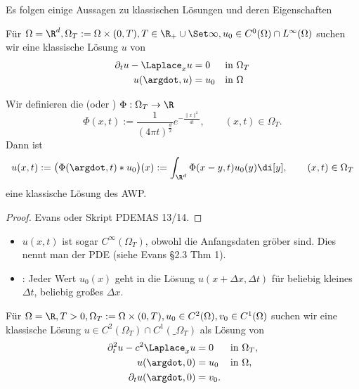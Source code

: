Es folgen einige Aussagen zu klassischen Lösungen und deren Eigenschaften

\begin{df} \label{1.19}
	Für $\Omega = \R^d, \Omega_T := \Omega \times (0, T), T \in \R_+ \cup \Set \infty, u_0 \in C^0(\Omega) \cap L^\infty(\Omega)$ suchen wir eine klassische Lösung $u$ von
	\begin{align*}
		\partial_t u - \Laplace_x u &= 0  &&\text{in $\Omega_T$}\\
		u(\argdot, u) &= u_0  &&\text{in $\Omega$}
	\end{align*}
\end{df}

\begin{st} \label{1.20}
	Wir definieren die  (oder ) $\Phi: \Omega_T \to \R$
	\[
		\Phi(x,t) := \frac{1}{(4\pi t)^{\frac{d}{2}}} e^{- \frac{\|x\|^2}{4t}},
		\qquad (x,t) \in \Omega_T.
	\]
	Dann ist
	\[
		u(x,t) := \big(\Phi(\argdot, t) \ast u_0\big) (x) := \int_{\R^d} \Phi(x-y, t) u_0(y) \di[y],
		\qquad (x,t) \in \Omega_T
	\]
	eine klassische Lösung des AWP.
	\begin{proof}
		Evans oder Skript PDEMAS 13/14.
	\end{proof}
	\begin{note}
		\begin{itemize}
			\item
				$u(x,t)$ ist sogar $C^\infty(\Omega_T)$, obwohl die Anfangsdaten gröber sind.
				Dies nennt man  der PDE (siehe Evans §2.3 Thm 1).
			\item
				: Jeder Wert $u_0(x)$ geht in die Lösung $u(x + \Delta x, \Delta t)$ für beliebig kleines $\Delta t$, beliebig großes $\Delta x$.
		\end{itemize}
	\end{note}
\end{st}

\begin{df}[AWP für Wellengleichung, $d = 1$] \label{1.21}
	Für $\Omega = \R, T > 0, \Omega_T := \Omega \times (0, T), u_0 \in C^2(\Omega), v_0 \in C^1(\Omega)$ suchen wir eine klassische Lösung $u \in C^2(\Omega_T) \cap C^1(\_{\Omega_T})$ als Lösung von
	\begin{align*}
		\partial_t^2 u - c^2 \Laplace_x u &= 0 &&\text{in $\Omega_T$}, \\
		u(\argdot, 0) &= u_0  && \text{in $\Omega$}, \\
		\partial_t u(\argdot, 0) &= v_0.
	\end{align*}
\end{df}

